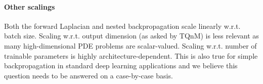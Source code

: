 \paragraph{Other scalings}
Both the forward Laplacian and nested backpropagation scale linearly w.r.t. batch size.
Scaling w.r.t. output dimension (as asked by TQnM) is less relevant as many high-dimensional PDE problems are scalar-valued.
Scaling w.r.t. number of trainable parameters is highly architecture-dependent. This is also true for simple backpropagation in standard deep learning applications and we believe this question needs to be answered on a case-by-case basis.


